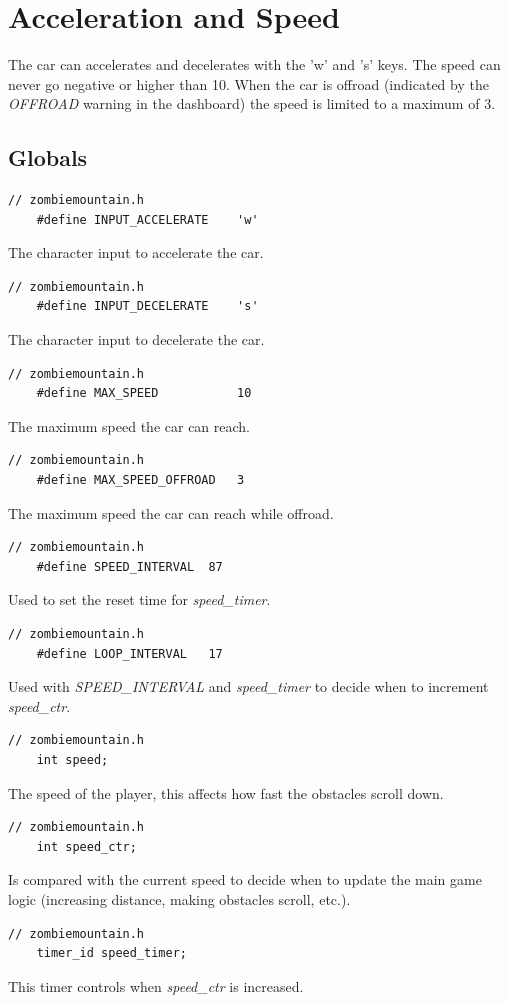 \documentclass{article}
\begin{document}
\clearpage

\section{Acceleration and Speed}
The car can accelerates and decelerates with the 'w' and 's' keys. The speed can never go negative or higher than 10. When the car is offroad (indicated by the \emph{OFFROAD} warning in the dashboard) the speed is limited to a maximum of 3.

\subsection*{Globals}
\begin{lstlisting}[style=CStyle]
	// zombiemountain.h
	#define INPUT_ACCELERATE	'w'	
\end{lstlisting}
The character input to accelerate the car.
\begin{lstlisting}[style=CStyle]
	// zombiemountain.h
	#define INPUT_DECELERATE	's'
\end{lstlisting}
The character input to decelerate the car.
\begin{lstlisting}[style=CStyle]
	// zombiemountain.h
	#define MAX_SPEED			10
\end{lstlisting}
The maximum speed the car can reach.
\begin{lstlisting}[style=CStyle]
	// zombiemountain.h
	#define MAX_SPEED_OFFROAD	3
\end{lstlisting}
The maximum speed the car can reach while offroad.
\begin{lstlisting}[style=CStyle]
	// zombiemountain.h
	#define SPEED_INTERVAL	87
\end{lstlisting}
Used to set the reset time for \emph{speed\_timer}.
\begin{lstlisting}[style=CStyle]
	// zombiemountain.h
	#define LOOP_INTERVAL	17
\end{lstlisting}
Used with \emph{SPEED\_INTERVAL} and \emph{speed\_timer} to decide when to increment \emph{speed\_ctr}.
\begin{lstlisting}[style=CStyle]
	// zombiemountain.h
	int speed;
\end{lstlisting}
The speed of the player, this affects how fast the obstacles scroll down.
\begin{lstlisting}[style=CStyle]
	// zombiemountain.h
	int speed_ctr;
\end{lstlisting}
Is compared with the current speed to decide when to update the main game logic (increasing distance, making obstacles scroll, etc.).
\begin{lstlisting}[style=CStyle]
	// zombiemountain.h
	timer_id speed_timer;
\end{lstlisting}
This timer controls when \emph{speed\_ctr} is increased.
\newpage
\end{document}
